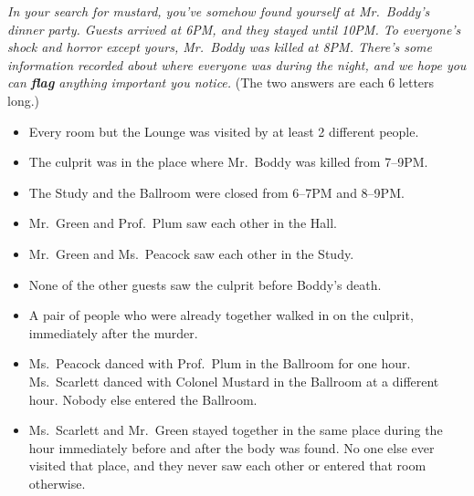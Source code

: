 \begin{tcolorbox}[
    title=\textbf{Puzzle \textit{Mustard}},
    colback=white,
    colframe=black!40,
    boxrule=0.6pt,
    arc=1.5mm,
    fontupper=\scriptsize,
    fonttitle=\small\bfseries,
    left=2mm,
    right=2mm,
    top=1.5mm,
    bottom=1.5mm,
    boxsep=1mm,
    before skip=3pt,
    after skip=3pt
]

\noindent
\textit{
In your search for mustard, you've somehow found yourself at Mr.~Boddy's
dinner party. Guests arrived at 6PM, and they stayed until 10PM.
To everyone's shock and horror except yours, Mr.~Boddy was killed at 8PM.
There's some information recorded about where everyone was during the night,
and we hope you can \textbf{flag} anything important you notice.
}
(The two answers are each 6 letters long.)

\vspace{0.5em}

\begin{itemize}[
    leftmargin=*,
    itemsep=3pt,
    topsep=3pt,
    parsep=0pt
]

    \item Every room but the Lounge was visited by at least 2 different people.

    \item The culprit was in the place where Mr.~Boddy was killed from 7--9PM.

    \item The Study and the Ballroom were closed from 6--7PM and 8--9PM.

    \item Mr.~Green and Prof.~Plum saw each other in the Hall.

    \item Mr.~Green and Ms.~Peacock saw each other in the Study.

    \item None of the other guests saw the culprit before Boddy's death.

    \item A pair of people who were already together walked in on the culprit,
    immediately after the murder.

    \item Ms.~Peacock danced with Prof.~Plum in the Ballroom for one hour.
    Ms.~Scarlett danced with Colonel Mustard in the Ballroom at a different hour.
    Nobody else entered the Ballroom.

    \item Ms.~Scarlett and Mr.~Green stayed together in the same place during
    the hour immediately before and after the body was found.
    No one else ever visited that place, and they never saw each other or
    entered that room otherwise.


\end{itemize}
\end{tcolorbox}
